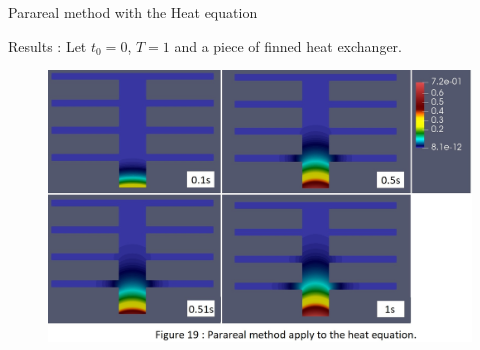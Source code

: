 \begin{frame}[allowframebreaks]{Parareal method with the Heat equation}
	\newpage
	
	Results : Let $t_0=0$, $T=1$ and a piece of finned heat exchanger.
	\begin{figure}[H]
		\centering
		\includegraphics[width=0.7\linewidth]{"images/parareal/heat_results.jpg"}
	\end{figure}
\end{frame}






